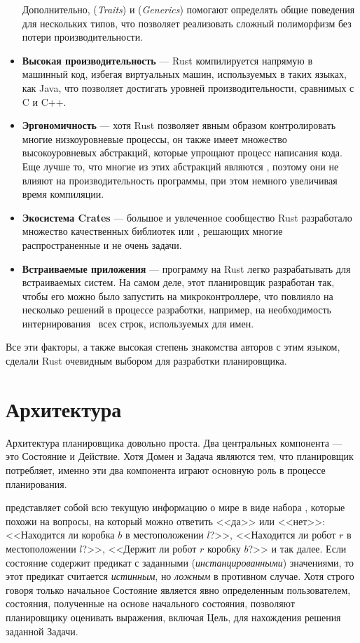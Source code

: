 \begin{itemize}
    Дополнительно,  (\textit{Traits}) и  (\textit{Generics})
    помогают определять общие поведения для нескольких типов,
    что позволяет реализовать сложный полиморфизм без потери производительности.
  \item \textbf{Высокая производительность} --- Rust компилируется напрямую в машинный код,
    избегая виртуальных машин, используемых в таких языках, как Java,
    что позволяет достигать уровней производительности, сравнимых с C и C++.
  \item \textbf{Эргономичность} --- хотя Rust позволяет явным образом контролировать
    многие низкоуровневые процессы, он также имеет множество высокоуровневых абстракций,
    которые упрощают процесс написания кода.
    Еще лучше то, что многие из этих абстракций являются ,
    поэтому они не влияют на производительность программы,
    при этом немного увеличивая время компиляции.
  \item \textbf{Экосистема Crates} --- большое и увлеченное сообщество Rust
    разработало множество качественных библиотек или ,
    решающих многие распространенные и не очень задачи.
  \item \textbf{Встраиваемые приложения} --- программу на Rust легко разрабатывать для встраиваемых систем.
    На самом деле, этот планировщик разработан так,
    чтобы его можно было запустить на микроконтроллере,
    что повлияло на несколько решений в процессе разработки,
    например, на необходимость интернирования~\cite{enwiki:interning} всех строк, используемых для имен.
\end{itemize}

Все эти факторы, а также высокая степень знакомства авторов с этим языком,
сделали Rust очевидным выбором для разработки планировщика.

\section{Архитектура}

Архитектура планировщика довольно проста.
Два центральных компонента — это Состояние и Действие.
Хотя Домен и Задача являются тем, что планировщик потребляет,
именно эти два компонента играют основную роль в процессе планирования.

 представляет собой всю текущую информацию о мире
в виде набора , которые похожи на вопросы,
на который можно ответить <<да>> или <<нет>>:
<<Находится ли коробка $b$ в местоположении $l$?>>,
<<Находится ли робот $r$ в местоположении $l$?>>,
<<Держит ли робот $r$ коробку $b$?>> и так далее\footnotemark{}.
Если состояние содержит предикат с заданными (\textit{инстанцированными}) значениями,
то этот предикат считается \textit{истинным}, но \textit{ложным} в противном случае.
Хотя строго говоря только начальное Состояние
является явно определенным пользователем,
состояния, полученные на основе начального состояния, позволяют
планировщику оценивать выражения,
включая Цель, для нахождения решения заданной Задачи.

